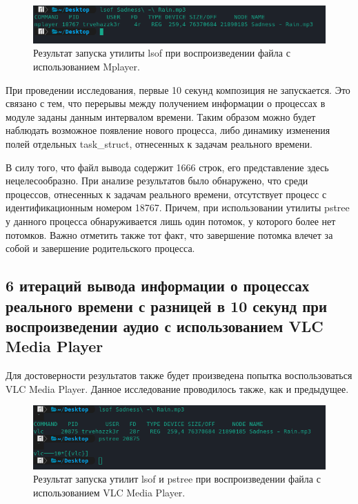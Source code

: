 \begin{figure}[H]
	\centering
	\includegraphics[scale=0.8]{img/mplayerlsof.png}
	\caption{Результат запуска утилиты lsof при воспроизведении файла с использованием Mplayer.}
	\label{fig:mplayerlsof}
\end{figure}

При проведении исследования, первые 10 секунд композиция не запускается. Это связано с тем, что перерывы между получением информации о процессах в модуле заданы данным интервалом времени. Таким образом можно будет наблюдать возможное появление нового процесса, либо динамику изменения полей отдельных task\_struct, отнесенных к задачам реального времени.

В силу того, что файл вывода содержит 1666 строк, его представление здесь нецелесообразно. При анализе результатов было обнаружено, что среди процессов, отнесенных к задачам реального времени, отсутствует процесс с идентификационным номером 18767. Причем, при использовании утилиты pstree у данного процесса обнаруживается лишь один потомок, у которого более нет потомков. Важно отметить также тот факт, что завершение потомка влечет за собой и завершение родительского процесса.

\subsection{6 итераций вывода информации о процессах реального времени с разницей в 10 секунд при воспроизведении аудио с использованием VLC Media Player}
Для достоверности результатов также будет произведена попытка воспользоваться VLC Media Player. Данное исследование проводилось также, как и предыдущее.

\begin{figure}[H]
	\centering
	\includegraphics[scale=0.8]{img/vlclsof.png}
	\caption{Результат запуска утилит lsof и pstree при воспроизведении файла с использованием VLC Media Player.}
	\label{fig:vlclsof}
\end{figure}

